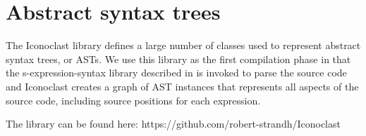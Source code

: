 \chapter{Abstract syntax trees}
\label{chap-ast}

The Iconoclast library defines a large number of classes used to
represent abstract syntax trees, or ASTs.  We use this library as the
first compilation phase in that the s-expression-syntax library
described in  is invoked to parse
the source code and Iconoclast creates a graph of AST instances that
represents all aspects of the source code, including source positions
for each expression.

The library can be found here: https://github.com/robert-strandh/Iconoclast
